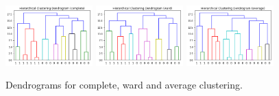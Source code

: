 \begin{figure}[H]
	\centering
	\includegraphics[width=0.3\textwidth]{clusteringMethods/hierarchicalclustering/fig/CompleteClustering.png}
	\includegraphics[width=0.3\textwidth]{clusteringMethods/hierarchicalclustering/fig/WardClustering.png}
	\includegraphics[width=0.3\textwidth]{clusteringMethods/hierarchicalclustering/fig/AverageClustering.png}
	\caption{Dendrograms for complete, ward and average clustering.}
	\label{fig:dendrogramcluster}
\end{figure}









